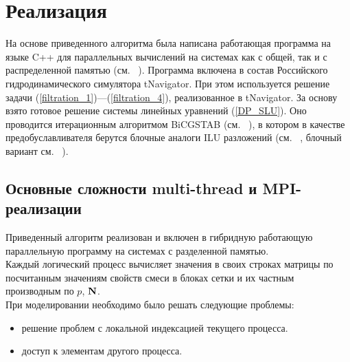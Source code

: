 \documentclass[12pt,a4paper]{article}
\begin{document}
\section{Реализация}
На основе приведенного алгоритма была написана работающая программа на языке C++ для параллельных вычислений на системах как с общей, так и с распределенной памятью (см. ~\cite{Bogachev}). Программа включена в состав Российского гидродинамического симулятора tNavigator. При этом используется решение задачи (\ref{filtration_1})---(\ref{filtration_4}), реализованное в tNavigator. За основу взято готовое решение системы линейных уравнений (\ref{DP_SLU}). Оно проводится итерационным алгоритмом BiCGSTAB (см. ~\cite{Saad}), в котором в качестве предобуславливателя берутся блочные аналоги ILU разложений (см. ~\cite{Saad}, блочный вариант см. ~\cite{BogachevJabitskii-ILU}).

\subsection{Основные сложности multi-thread и MPI-реализации}
Приведенный алгоритм реализован и включен в гибридную работающую параллельную программу на системах с разделенной памятью. \\
Каждый логический процесс вычисляет значения в своих строках матрицы по посчитанным значениям свойств смеси в блоках сетки
и их частным производным по $p$, $\bf N$.\\
При моделировании необходимо было решать следующие проблемы:
\begin{itemize}
\item решение проблем с локальной индексацией текущего процесса.
\item доступ к элементам другого процесса.
\end{itemize}
\newpage
\end{document}
